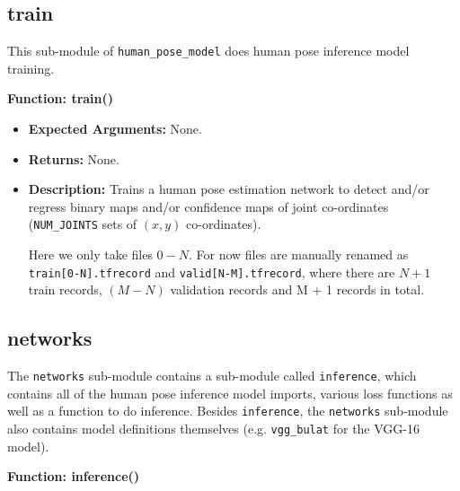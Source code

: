 \documentclass{scrreprt}
\begin{document}
\break
\subsection{train}

This sub-module of \verb|human_pose_model| does human pose inference model
training.

\textbf{Function: train()}

\begin{itemize}
        \item \textbf{Expected Arguments:} None.

        \item \textbf{Returns:} None.

        \item \textbf{Description:} Trains a human pose estimation network to
                detect and/or regress binary maps and/or confidence maps of
                joint co-ordinates (\verb|NUM_JOINTS| sets of $(x, y)$ co-ordinates).

                Here we only take files $0-N$.  For now files are manually renamed as
                \verb|train[0-N].tfrecord| and \verb|valid[N-M].tfrecord|,
                where there are $N + 1$ train records, $(M - N)$ validation
                records and M + 1 records in total.
\end{itemize}

\subsection{networks}

The \verb|networks| sub-module contains a sub-module called \verb|inference|,
which contains all of the human pose inference model imports, various loss
functions as well as a function to do inference. Besides \verb|inference|, the
\verb|networks| sub-module also contains model definitions themselves (e.g.
\verb|vgg_bulat| for the VGG-16 model).

\textbf{Function: inference()}
\end{document}
